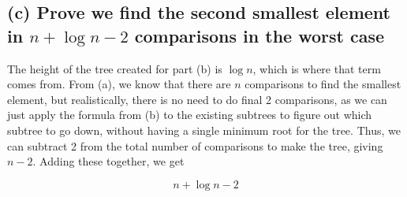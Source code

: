 \documentclass{article}
\begin{document}
\subsection*{(c) \normalsize Prove we find the second smallest element in $n + \log n - 2$ comparisons in the worst case}
The height of the tree created for part (b) is $\log n$, which is where that term comes from. From (a), we know that there are $n$ comparisons to find the smallest element, but realistically, there is no need to do final 2 comparisons, as we can just apply the formula from (b) to the existing subtrees to figure out which subtree to go down, without having a single minimum root for the tree. Thus, we can subtract 2 from the total number of comparisons to make the tree, giving $n-2$. Adding these together, we get

$$n + \log n - 2$$
\end{document}
